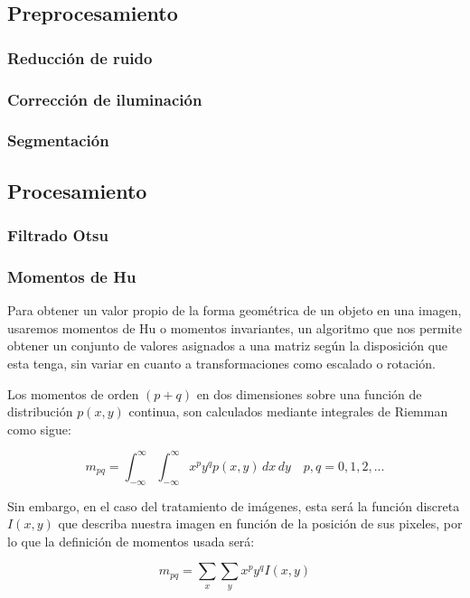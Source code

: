 \documentclass[letter]{article}
\begin{document}
\subsection{Preprocesamiento}
\label{sec:org2bdcc9b}

\subsubsection{Reducción de ruido}
\label{sec:orga244419}
\subsubsection{Corrección de iluminación}
\label{sec:orge95baa3}

\subsubsection{Segmentación}
\label{sec:org590f94b}

\subsection{Procesamiento}
\label{sec:org2590916}
\subsubsection{Filtrado Otsu}
\label{sec:orgb0d365c}
\subsubsection{Momentos de Hu}
\label{sec:orged0e01b}
Para obtener un valor propio de la forma geométrica de un objeto en una imagen,
usaremos momentos de Hu o momentos invariantes, un algoritmo que nos permite
obtener un conjunto de valores asignados a una matriz según la disposición que
esta tenga, sin variar en cuanto a transformaciones como escalado o rotación.

Los momentos de orden \((p+q)\) en dos dimensiones sobre una función de
distribución \(p(x, y)\) continua, son calculados mediante integrales de Riemman
como sigue:

$$
m_{pq} =  \int_{-\infty}^{\infty} \int_{-\infty}^{\infty} x^p y^q p(x, y)\,dx\,dy \quad p, q = 0, 1, 2, ...
$$

Sin embargo, en el caso del tratamiento de imágenes, esta será la función
discreta \(I(x, y)\) que describa nuestra imagen en función de la posición de sus
pixeles, por lo que la definición de momentos usada será:

$$
m_{pq} = \sum_x \sum_y x^p y^q I(x, y)
$$
\end{document}
